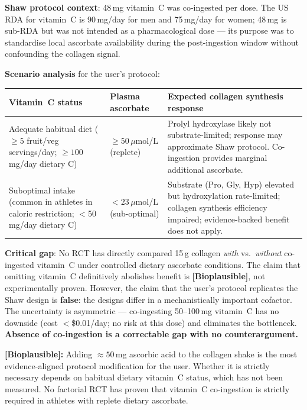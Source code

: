 \textbf{Shaw protocol context}: 48\,mg vitamin~C was co-ingested per dose. The US RDA for vitamin~C is 90\,mg/day for men and 75\,mg/day for women; 48\,mg is sub-RDA but was not intended as a pharmacological dose --- its purpose was to standardise local ascorbate availability during the post-ingestion window without confounding the collagen signal.

\textbf{Scenario analysis} for the user's protocol:

\begin{center}
\begin{tabular}{>{\raggedright\arraybackslash}p{3.2cm}
                >{\raggedright\arraybackslash}p{3.8cm}
                >{\raggedright\arraybackslash}p{5.5cm}}
\toprule
\textbf{Vitamin~C status} & \textbf{Plasma ascorbate} & \textbf{Expected collagen synthesis response} \\
\midrule
Adequate habitual diet (${\geq}5$ fruit/veg servings/day; ${\geq}100$\,mg/day dietary C) & ${\geq}50$\,$\mu$mol/L (replete) & Prolyl hydroxylase likely not substrate-limited; response may approximate Shaw protocol. Co-ingestion provides marginal additional ascorbate. \\
\addlinespace
Suboptimal intake (common in athletes in caloric restriction; $<$50\,mg/day dietary C) & ${<}23$\,$\mu$mol/L (sub-optimal) & Substrate (Pro, Gly, Hyp) elevated but hydroxylation rate-limited; collagen synthesis efficiency impaired; evidence-backed benefit does not apply. \\
\bottomrule
\end{tabular}
\end{center}

\textbf{Critical gap}: No RCT has directly compared 15\,g collagen \textit{with} vs.\ \textit{without} co-ingested vitamin~C under controlled dietary ascorbate conditions. The claim that omitting vitamin~C definitively abolishes benefit is \textbf{[Bioplausible]}, not experimentally proven. However, the claim that the user's protocol replicates the Shaw design is \textbf{false}: the designs differ in a mechanistically important cofactor. The uncertainty is asymmetric --- co-ingesting 50--100\,mg vitamin~C has no downside (cost $<$\$0.01/day; no risk at this dose) and eliminates the bottleneck. \textbf{Absence of co-ingestion is a correctable gap with no counterargument.}

\textbf{[Bioplausible]:} Adding ${\approx}50$\,mg ascorbic acid to the collagen shake is the most evidence-aligned protocol modification for the user. Whether it is strictly necessary depends on habitual dietary vitamin~C status, which has not been measured. No factorial RCT has proven that vitamin~C co-ingestion is strictly required in athletes with replete dietary ascorbate.

